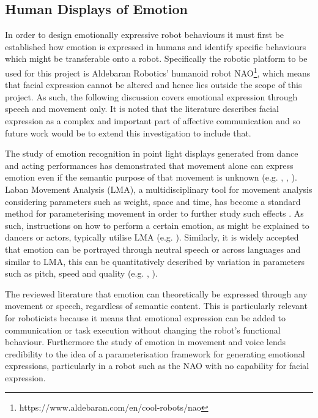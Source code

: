 \documentclass[11pt,a4paper]{report}
\begin{document}
\subsection{Human Displays of Emotion}
In order to design emotionally expressive robot behaviours it must first be established how emotion is expressed in humans and identify specific behaviours which might be transferable onto a robot. Specifically the robotic platform to be used for this project is Aldebaran Robotics' humanoid robot NAO\footnote{https://www.aldebaran.com/en/cool-robots/nao}, which means that facial expression cannot be altered and hence lies outside the scope of this project.  As such, the following discussion covers emotional expression through speech and movement only. It is noted that the literature describes facial expression as a complex and important part of affective communication and so future work would be to extend this investigation to include that.

The study of emotion recognition in point light displays generated from dance and acting performances has demonstrated that movement alone can express emotion even if the semantic purpose of that movement is unknown (e.g. \cite{dittrich1996perception}, \cite{pollick2001perceiving}, \cite{atkinson2004emotion}). Laban Movement Analysis (LMA), a multidisciplinary tool for movement analysis considering parameters such as weight, space and time, has become a standard method for parameterising movement in order to further study such effects \cite{lab2011}. As such, instructions on how to perform a certain emotion, as might be explained to dancers or actors, typically utilise LMA (e.g. \cite{newlove1993laban}). Similarly, it is widely accepted that emotion can be portrayed through neutral speech \cite{neumann2000mood} or across languages \cite{scherer2000cross} and similar to LMA, this can be quantitatively described by variation in parameters such as pitch, speed and quality (e.g. \cite{scherer1986vocal}, \cite{cowie2001emotion}). 

The reviewed literature that emotion can theoretically be expressed through any movement or speech, regardless of semantic content. This is particularly relevant for roboticists because it means that emotional expression can be added to communication or task execution without changing the robot's functional behaviour. Furthermore the study of emotion in movement and voice lends credibility to the idea of a parameterisation framework for generating emotional expressions, particularly in a robot such as the NAO with no capability for facial expression. 
\end{document}
